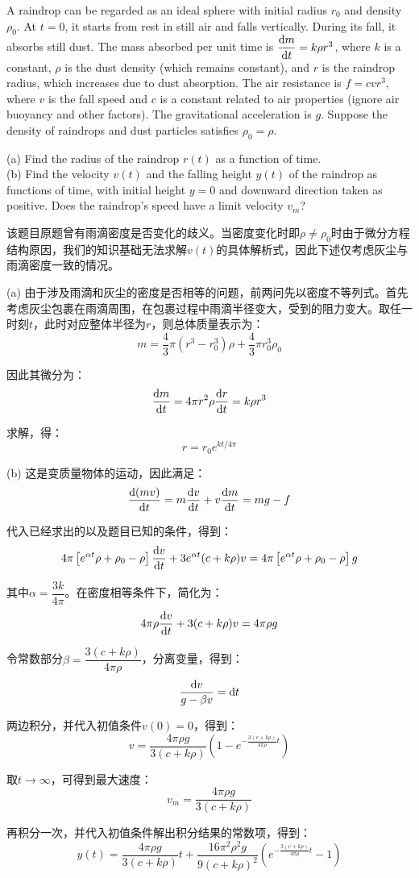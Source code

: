 \begin{solution}[微分方程]
    A raindrop can be regarded as an ideal sphere with initial radius $r_0$ and density $\rho_0$. At $t = 0$, it starts from rest in still air and falls vertically. During its fall, it absorbs still dust. The mass absorbed per unit time is $\dfrac{\dif m}{\dif t} = k\rho r^3$, where $k$ is a constant, $\rho$ is the dust density (which remains constant), and $r$ is the raindrop radius, which increases due to dust absorption. The air resistance is $f = cv r^3$, where $v$ is the fall speed and $c$ is a constant related to air properties (ignore air buoyancy and other factors). The gravitational acceleration is $g$. Suppose the density of raindrops and dust particles satisfies $\rho_0 = \rho$.

    (a) Find the radius of the raindrop $r(t)$ as a function of time.\\
    (b) Find the velocity $v(t)$ and the falling height $y(t)$ of the raindrop as functions of time, with initial height $y = 0$ and downward direction taken as positive. Does the raindrop's speed have a limit velocity $v_m$?\\

    \tcbrule

    该题目原题曾有雨滴密度是否变化的歧义。当密度变化时即$\rho \neq \rho_0$时由于微分方程结构原因，我们的知识基础无法求解$v(t)$的具体解析式，因此下述仅考虑灰尘与雨滴密度一致的情况。

    (a) 由于涉及雨滴和灰尘的密度是否相等的问题，前两问先以密度不等列式。首先考虑灰尘包裹在雨滴周围，在包裹过程中雨滴半径变大，受到的阻力变大。取任一时刻$t$，此时对应整体半径为$r$，则总体质量表示为：
    \[m = \dfrac{4}{3}\pi (r^3 - r_0^3) \rho + \dfrac{4}{3}\pi r_0^3\rho_0\]
    
    因此其微分为：
    \[\dfrac{\dif m}{\dif t} = 4\pi r^2\rho\dfrac{\dif r}{\dif t} = k\rho r^3\]

    求解，得：
    \[r = r_0 e^{kt/4\pi}\]

    (b) 这是变质量物体的运动，因此满足：
    \[\dfrac{\dif (mv)}{\dif t} = m\dfrac{\dif v}{\dif t} + v\dfrac{\dif m}{\dif t} = mg - f\]

    代入已经求出的以及题目已知的条件，得到：
    \[4\pi\left[e^{\alpha t}\rho + \rho_0 - \rho\right]\dfrac{\dif v}{\dif t} + 3e^{\alpha t}(c + k\rho)v = 4\pi\left[e^{\alpha t}\rho + \rho_0 - \rho\right]g\]

    其中$\alpha = \dfrac{3k}{4\pi}$。在密度相等条件下，简化为：
    \[4\pi\rho\dfrac{\dif v}{\dif t} + 3(c + k\rho)v = 4\pi \rho g\]

    令常数部分$\beta = \dfrac{3(c+k\rho)}{4\pi\rho}$，分离变量，得到：
    \[\dfrac{\dif v}{g - \beta v} = \dif t\]

    两边积分，并代入初值条件$v(0) = 0$，得到：
    \[v = \dfrac{4\pi\rho g}{3(c+k\rho)}(1 - e^{-\frac{3(c+k\rho)}{4\pi\rho}t})\]

    取$t\rightarrow \infty$，可得到最大速度：
    \[v_m = \dfrac{4\pi\rho g}{3(c+k\rho)}\]

    再积分一次，并代入初值条件解出积分结果的常数项，得到：
    \[y(t) = \dfrac{4\pi\rho g}{3(c+k\rho)}t + \dfrac{16\pi^2\rho^2 g}{9(c+k\rho)^2}(e^{-\frac{3(c+k\rho)}{4\pi\rho}t}-1)\]
\end{solution}

